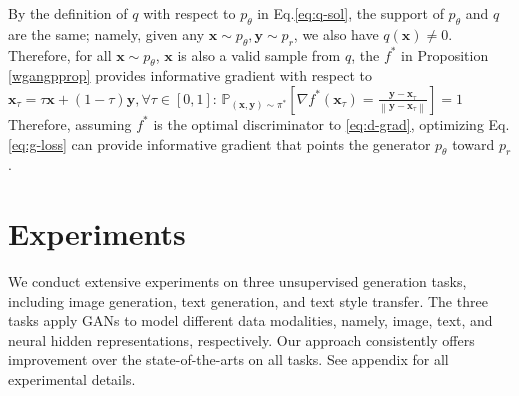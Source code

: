 \documentclass{article}
\newcommand{\0}{\bm{0}}
\newcommand{\xm}{\bm{x}}
\newcommand{\PP}{\mathbb{P}}
\newcommand{\norm}[1]{\left\|#1\right\|}
\newcommand{\x}{\bm{x}}
\newcommand{\y}{\bm{y}}
\newcommand{\PPz}{p}
\begin{document}
By the definition of $q$ with respect to $\PPz_{\theta}$ in Eq.\eqref{eq:q-sol}, the support of $\PPz_{\theta}$ and $q$ are the same; namely, given any $\x\sim \PPz_{\theta}, \y\sim \PPz_r$, we also have $q(\x) \neq 0$. Therefore, for all $\xm \sim \PPz_{\theta}$, $\xm$ is also a valid sample from $q$, the $f^*$ in {Proposition \ref{wgangpprop}} provides informative gradient with respect to $\x_\tau = \tau \x + (1-\tau)\y, \forall \tau\in [0,1]$:
$\PP_{(\x,\y)\sim\pi^*}\left[\nabla f^*(\x_\tau)=\frac{\y-\x_\tau}{\norm{\y-\x_\tau}}\right] = 1$
Therefore, assuming $f^*$ is the optimal discriminator to \eqref{eq:d-grad}, optimizing Eq.\eqref{eq:g-loss} can provide informative gradient that points the generator $p_\theta$ toward $p_r$.
 
 
 
\section{Experiments} \label{sec:results}
We conduct extensive experiments on three unsupervised generation tasks, including image generation, text generation, and text style transfer. The three tasks apply GANs to model different data modalities, namely, image, text, and neural hidden representations, respectively. Our approach consistently offers improvement over the state-of-the-arts on all tasks. See appendix for all experimental details.
\end{document}

